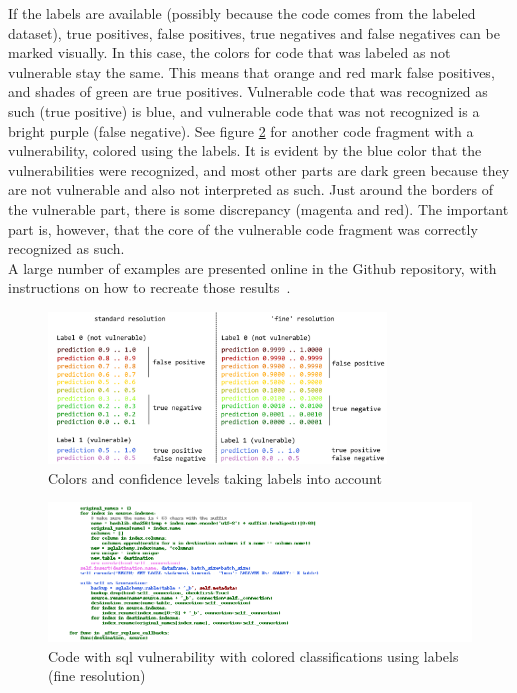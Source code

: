 \documentclass[
a4paper,
pagesize,
pdftex,
12pt,
twoside, %
BCOR=5mm, %
ngerman,
fleqn,
final,
]{scrartcl}
\begin{document}
	If the labels are available (possibly because the code comes from the labeled dataset), true positives, false positives, true negatives and false negatives can be marked visually. In this case, the colors for code that was labeled as not vulnerable stay the same. This means that orange and red mark false positives, and shades of green are true positives. Vulnerable code that was recognized as such (true positive) is blue, and vulnerable code that was not recognized is a bright purple (false negative). See figure \ref{fig:example2} for another code fragment with a vulnerability, colored using the labels. It is evident by the blue color that the vulnerabilities were recognized, and most other parts are dark green because they are not vulnerable and also not interpreted as such. Just around the borders of the vulnerable part, there is some discrepancy (magenta and red). The important part is, however, that the core of the vulnerable code fragment was correctly recognized as such.\\
	A large number of examples are presented online in the Github repository, with instructions on how to recreate those results~\cite{Wartschinski.2.12.2019}.
	
	\begin{figure}[h]
		\centering
		\includegraphics[width=0.8\textwidth]{img/colorkeylabeled}
		\caption{Colors and confidence levels taking labels into account}
		\label{fig:examplecolored}
	\end{figure}


	\begin{figure}[h]
	\centering
	\includegraphics[width=1\textwidth]{img/exampleSQL.png}
	\caption{Code with sql vulnerability with colored classifications using labels (fine resolution)}
	\label{fig:example2}
	\end{figure}
	
\end{document}
